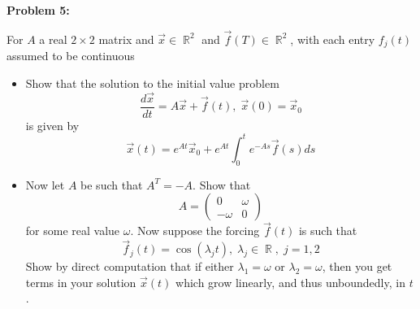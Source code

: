 \documentclass[12pt]{article}
\DeclareMathOperator{\RR}{\mathbb{R}}
\newenvironment{problem}[1]{
    \textbf{Problem #1:}
}{
    \rmfamily \vspace{2em}
}
\begin{document}
\begin{problem}{5}
    For \(A\) a real \(2 \times 2\) matrix and \(\vec{x} \in \RR^2\) and \(\vec{f}(T) \in \RR^2\), with each entry \(f_j(t)\) assumed to be continuous
    \begin{itemize}
        \item Show that the solution to the initial value problem
        \[
            \frac{d\vec{x}}{dt} = A\vec{x} + \vec{f}(t), \; \vec{x}(0) = \vec{x}_0
        \]
        is given by
        \[
            \vec{x}(t) = e^{At}\vec{x}_0 + e^{At} \int_0^t e^{-As} \vec{f}(s) ds
        \]
        \item Now let \(A\) be such that \(A^T = -A\). Show that
        \[
            A = \begin{pmatrix} 0 & \omega \\ -\omega & 0 \end{pmatrix}
        \]
        for some real value \(\omega\). Now suppose the forcing \(\vec{f}(t)\) is such that
        \[
            \vec{f}_j(t) = \cos(\lambda_j t), \; \lambda_j  \in \RR, \; j = 1, 2
        \]
        Show by direct computation that if either \(\lambda_1 = \omega\) or \(\lambda_2 = \omega\), then you get terms in your solution \(\vec{x}(t)\) which grow linearly, and thus
        unboundedly, in \(t\).
    \end{itemize}
\end{problem}
\end{document}
